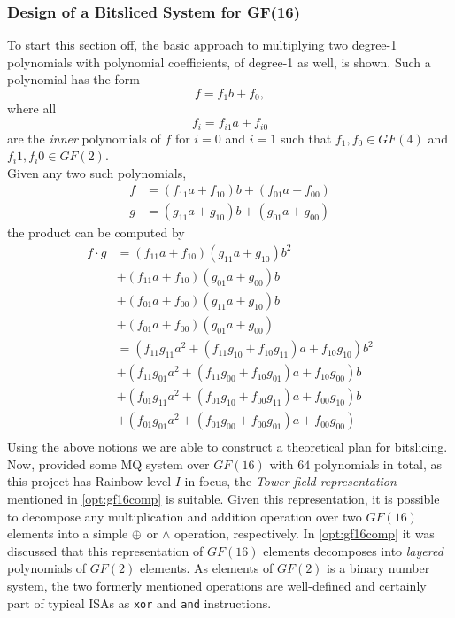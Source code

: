 \subsubsection{Design of a Bitsliced System for GF(16)} \label{bitslice:theory}
To start this section off, the basic approach to multiplying two degree-1 polynomials with polynomial coefficients, of degree-1 as well, is shown. Such a polynomial has the form
$$
    f = f_1b + f_0,
$$
where all
$$
    f_i = f_{i1}a+f_{i0}
$$
are the \emph{inner} polynomials of $f$ for $i = 0$ and $i = 1$ such that $f_1, f_0 \in GF(4)$ and $f_i1, f_i0 \in GF(2)$.\\ 
Given any two such polynomials,
\begin{equation*}
    \begin{split}
        f &= (f_{11}a+f_{10})b + (f_{01}a + f_{00})\\
        g &= (g_{11}a+g_{10})b + (g_{01}a + g_{00})
    \end{split}
\end{equation*}
the product can be computed by
\begin{equation} \label{bitslice:poly}
    \begin{split}
        f \cdot g &= (f_{11}a + f_{10})(g_{11}a + g_{10})b^2\\
        &+ (f_{11} a + f_{10})(g_{01}a + g_{00})b\\ 
        &+ (f_{01}a + f_{00})(g_{11}a + g_{10})b\\ 
        &+ (f_{01} a + f_{00})(g_{01}a + g_{00})\\
        &= (f_{11}g_{11}a^2 + (f_{11}g_{10} + f_{10}g_{11})a + f_{10}g_{10})b^2\\
        &+ (f_{11}g_{01}a^2 + (f_{11}g_{00} + f_{10}g_{01})a + f_{10}g_{00})b\\
        &+ (f_{01}g_{11}a^2 + (f_{01}g_{10} + f_{00}g_{11})a + f_{00}g_{10})b\\
        &+ (f_{01}g_{01}a^2 + (f_{01}g_{00} + f_{00}g_{01})a + f_{00}g_{00})\\
    \end{split}
\end{equation}
Using the above notions we are able to construct a theoretical plan for bitslicing.
\medskip\\
Now, provided some MQ system over $GF(16)$ with $64$ polynomials in total, as this project has Rainbow level $I$ in focus, the \emph{Tower-field representation} mentioned in \cref{opt:gf16comp} is suitable. Given this representation, it is possible to decompose any multiplication and addition operation over two $GF(16)$ elements into a simple $\oplus$ or $\wedge$ operation, respectively. In \cref{opt:gf16comp} it was discussed that this representation of $GF(16)$ elements decomposes into \emph{layered} polynomials of $GF(2)$ elements. As elements of $GF(2)$ is a binary number system, the two formerly mentioned operations are well-defined and certainly part of typical ISAs as \texttt{xor} and \texttt{and} instructions.\medskip\\
